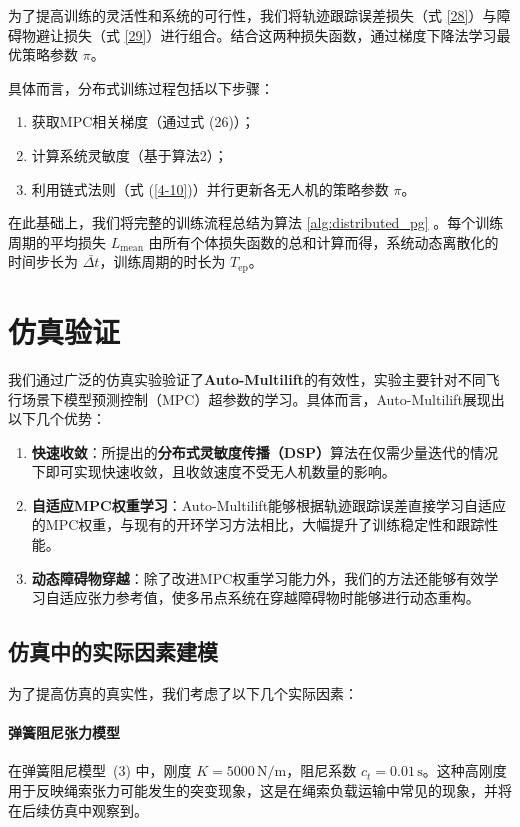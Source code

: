 \documentclass[lang=chs, degree=master, blindreview=false, winfonts=true]{yanputhesis}
\begin{document}
为了提高训练的灵活性和系统的可行性，我们将轨迹跟踪误差损失（式 \ref{28}）与障碍物避让损失（式 \ref{29}）进行组合。结合这两种损失函数，通过梯度下降法学习最优策略参数 $\pi$。

具体而言，分布式训练过程包括以下步骤：
\begin{enumerate}
    \item 获取MPC相关梯度（通过式 (26)）；
    \item 计算系统灵敏度（基于算法2）；
    \item 利用链式法则（式 (\ref{4-10})）并行更新各无人机的策略参数 $\pi$。
\end{enumerate}

在此基础上，我们将完整的训练流程总结为算法 \ref{alg:distributed_pg} 。每个训练周期的平均损失 $L_{\text{mean}}$ 由所有个体损失函数的总和计算而得，系统动态离散化的时间步长为 $\bar{\Delta t}$，训练周期的时长为 $T_{\text{ep}}$。


\section{仿真验证}
我们通过广泛的仿真实验验证了\textbf{Auto-Multilift}的有效性，实验主要针对不同飞行场景下模型预测控制（MPC）超参数的学习。具体而言，Auto-Multilift展现出以下几个优势：

\begin{enumerate}
    \item \textbf{快速收敛}：所提出的\textbf{分布式灵敏度传播（DSP）}算法在仅需少量迭代的情况下即可实现快速收敛，且收敛速度不受无人机数量的影响。  

    \item \textbf{自适应MPC权重学习}：Auto-Multilift能够根据轨迹跟踪误差直接学习自适应的MPC权重，与现有的开环学习方法相比，大幅提升了训练稳定性和跟踪性能。  

    \item \textbf{动态障碍物穿越}：除了改进MPC权重学习能力外，我们的方法还能够有效学习自适应张力参考值，使多吊点系统在穿越障碍物时能够进行动态重构。
\end{enumerate}

\subsection{仿真中的实际因素建模}

为了提高仿真的真实性，我们考虑了以下几个实际因素：

\paragraph{弹簧阻尼张力模型} 在弹簧阻尼模型~(3) 中，刚度 \( K = 5000 \, \text{N/m} \)，阻尼系数 \( c_t = 0.01 \, \text{s} \)。这种高刚度用于反映绳索张力可能发生的突变现象，这是在绳索负载运输中常见的现象，并将在后续仿真中观察到。
\end{document}
